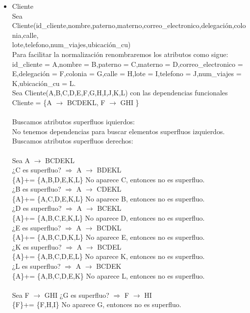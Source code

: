 \documentclass{article}
\begin{document}
\begin{itemize}
\item Cliente\\
Sea Cliente(id\_cliente,nombre,paterno,materno,correo\_electronico,delegación,colonia,calle,  \\ lote,telefono,num\_viajes,ubicación\_cu)\\
Para facilitar la normalización renombraremos los atributos como sigue:
id\_cliente = A,nombre = B,paterno = C,materno = D,correo\_electronico = E,delegación = F,colonia = G,calle = H,lote = I,telefono = J,num\_viajes = K,ubicación\_cu = L.\\
Sea Cliente(A,B,C,D,E,F,G,H,I,J,K,L) con las dependencias funcionales
Cliente = \{A $\rightarrow$ BCDEKL, F $\rightarrow$ GHI  \} \\
\\
Buscamos atributos superfluos iquierdos:\\
No tenemos dependencias para buscar elementos superfluos izquierdos.\\
Buscamos atributos superfluos derechos:\\
\\
Sea A $\rightarrow$  BCDEKL\\
¿C es superfluo? $\Rightarrow$ A $\rightarrow$ BDEKL \\
\{A\}+= \{A,B,D,E,K,L\} No aparece C, entonces no es superfluo.\\
¿B es superfluo? $\Rightarrow$ A $\rightarrow$ CDEKL \\
\{A\}+= \{A,C,D,E,K,L\} No aparece B, entonces no es superfluo.\\
¿D es superfluo? $\Rightarrow$ A $\rightarrow$ BCEKL \\
\{A\}+= \{A,B,C,E,K,L\}  No aparece D, entonces no es superfluo.\\
¿E es superfluo? $\Rightarrow$ A $\rightarrow$ BCDKL \\
\{A\}+= \{A,B,C,D,K,L\}  No aparece E, entonces no es superfluo.\\
¿K es superfluo? $\Rightarrow$ A $\rightarrow$ BCDEL \\
\{A\}+= \{A,B,C,D,E,L\}  No aparece K, entonces no es superfluo.\\
¿L es superfluo? $\Rightarrow$ A $\rightarrow$ BCDEK \\
\{A\}+= \{A,B,C,D,E,K\}  No aparece L, entonces no es superfluo.\\
\\
Sea  F $\rightarrow$ GHI 
¿G es superfluo? $\Rightarrow$ F $\rightarrow$ HI \\
\{F\}+= \{F,H,I\} No aparece G, entonces no es superfluo.\\

\end{itemize}
\end{document}
